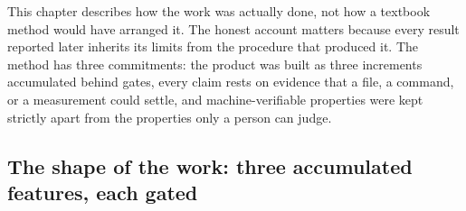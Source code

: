 

This chapter describes how the work was actually done, not how a textbook
method would have arranged it. The honest account matters because every result
reported later inherits its limits from the procedure that produced it. The
method has three commitments: the product was built as three increments
accumulated behind gates, every claim rests on evidence that a file, a command,
or a measurement could settle, and machine-verifiable properties were kept
strictly apart from the properties only a person can judge.

\subsection{The shape of the work: three accumulated features, each gated}

